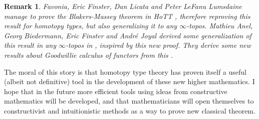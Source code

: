 \documentclass{article}
\newtheorem{remark}{Remark}
\begin{document}
\begin{remark}
Favonia, Eric Finster, Dan Licata and Peter LeFanu Lumsdaine manage to prove the Blakers-Massey theorem in HoTT \cite{hou2016mechanization}, therefore reproving this result for homotopy types, but also generalizing it to any $\infty$-topos. Mathieu Anel, Georg Biedermann, Eric Finster and Andr{\'e} Joyal derived some generalization of this result in any $\infty$-topos in \cite{anel2017generalized}, inspired by this new proof. They derive some new results about Goodwillie calculus of functors from this \cite{anel2018goodwillie}. 
\end{remark}

The moral of this story is that homotopy type theory has proven itself a useful (albeit not definitive) tool in the development of these new higher mathematics. I hope that in the future more efficient tools using ideas from constructive mathematics will be developed, and that mathematicians will open themselves to constructivist and intuitionistic methods as a way to prove new classical theorem.



\end{document}
